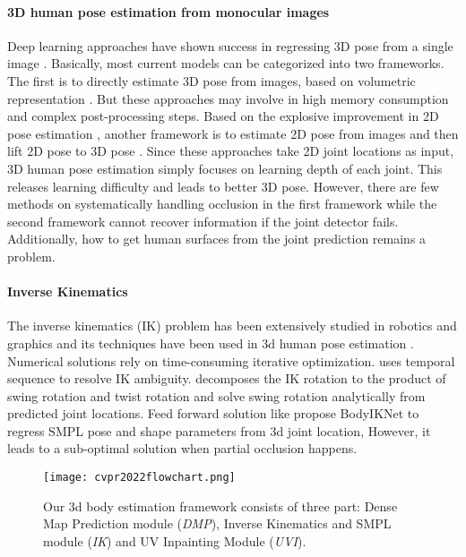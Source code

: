 \documentclass[10pt,twocolumn,letterpaper]{article}
\begin{document}
\paragraph{3D human pose estimation from monocular images} Deep learning approaches
have shown success in regressing 3D pose from
a single image \cite{rootnet,LCRnet++,xiao2018simple,simple,semanticsgcn,volumetric,gpa,haoyubmvc2021,cross,dynamicpose}. Basically, most current models can be categorized into two frameworks. The first is to directly estimate 3D pose from images, based on volumetric representation \cite{volumetric,rootnet}. But these approaches may involve in high memory consumption and complex post-processing steps. Based on the explosive improvement
in 2D pose estimation \cite{xiao2018simple}, another framework is to estimate 2D pose from images and then lift 2D pose to 3D pose \cite{semanticsgcn,simple}. Since these approaches take 2D joint locations as input, 3D human pose estimation simply focuses on learning depth of each joint. This releases learning difficulty and
leads to better 3D pose. However, there are few methods on systematically handling occlusion in the first framework while the second framework cannot recover information if the joint detector fails. Additionally, how to get human surfaces from the joint prediction remains a problem. 

\paragraph{Inverse Kinematics} The inverse kinematics (IK) problem has been extensively studied in robotics \cite{ik1,ik3} and graphics \cite{ik2} and its techniques have been used in 3d human pose estimation \cite{motionretarget,HybrIK,pare,zhou2021monocular,zhou2020monocular}.  Numerical solutions \cite{ik1,ik2,ik3} rely on time-consuming iterative optimization.  \cite{motionretarget} uses temporal sequence to resolve IK ambiguity. \cite{HybrIK} decomposes the IK rotation to the product of swing rotation and twist rotation and solve swing rotation analytically from predicted joint locations. Feed forward solution like \cite{zhou2020monocular,zhou2021monocular} propose BodyIKNet to regress SMPL \cite{smpl} pose and shape parameters from 3d joint location, However, it leads to a sub-optimal solution when partial occlusion happens. 


\begin{figure*}[t]
\begin{center}
   \texttt{[image: cvpr2022flowchart.png]}
\end{center}
   \caption{Our 3d body estimation framework consists of three part: Dense Map Prediction module (\textit{DMP}), Inverse Kinematics and SMPL module (\textit{IK}) and UV Inpainting Module (\textit{UVI}).
   }
\label{fig:flowchart}
\end{figure*}
\end{document}
